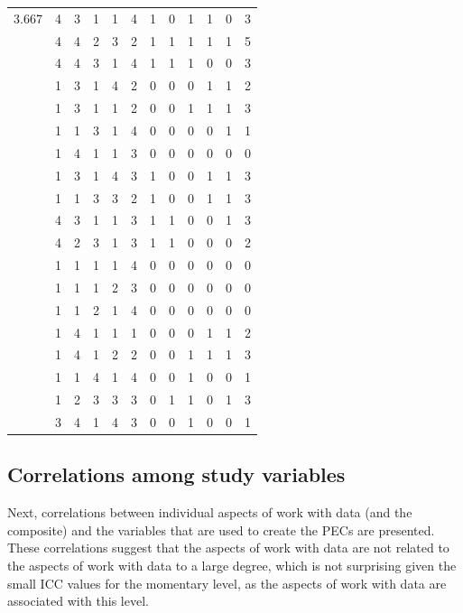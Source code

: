 \documentclass[]{book}
\theoremstyle{definition}
\theoremstyle{definition}
\theoremstyle{definition}
\theoremstyle{remark}
\begin{document}
\begin{table}
{\begin{tabular}[t]{rrrrrrrrrrrr}
3.667 & 4 & 3 & 1 & 1 & 4 & 1 & 0 & 1 & 1 & 0 & 3\\
 & 4 & 4 & 2 & 3 & 2 & 1 & 1 & 1 & 1 & 1 & 5\\
 & 4 & 4 & 3 & 1 & 4 & 1 & 1 & 1 & 0 & 0 & 3\\
 & 1 & 3 & 1 & 4 & 2 & 0 & 0 & 0 & 1 & 1 & 2\\
 & 1 & 3 & 1 & 1 & 2 & 0 & 0 & 1 & 1 & 1 & 3\\
 & 1 & 1 & 3 & 1 & 4 & 0 & 0 & 0 & 0 & 1 & 1\\
 & 1 & 4 & 1 & 1 & 3 & 0 & 0 & 0 & 0 & 0 & 0\\
 & 1 & 3 & 1 & 4 & 3 & 1 & 0 & 0 & 1 & 1 & 3\\
 & 1 & 1 & 3 & 3 & 2 & 1 & 0 & 0 & 1 & 1 & 3\\
 & 4 & 3 & 1 & 1 & 3 & 1 & 1 & 0 & 0 & 1 & 3\\
 & 4 & 2 & 3 & 1 & 3 & 1 & 1 & 0 & 0 & 0 & 2\\
 & 1 & 1 & 1 & 1 & 4 & 0 & 0 & 0 & 0 & 0 & 0\\
 & 1 & 1 & 1 & 2 & 3 & 0 & 0 & 0 & 0 & 0 & 0\\
 & 1 & 1 & 2 & 1 & 4 & 0 & 0 & 0 & 0 & 0 & 0\\
 & 1 & 4 & 1 & 1 & 1 & 0 & 0 & 0 & 1 & 1 & 2\\
 & 1 & 4 & 1 & 2 & 2 & 0 & 0 & 1 & 1 & 1 & 3\\
 & 1 & 1 & 4 & 1 & 4 & 0 & 0 & 1 & 0 & 0 & 1\\
 & 1 & 2 & 3 & 3 & 3 & 0 & 1 & 1 & 0 & 1 & 3\\
 & 3 & 4 & 1 & 4 & 3 & 0 & 0 & 1 & 0 & 0 & 1\\
\bottomrule
\end{tabular}}
\end{table}

\subsection{Correlations among study
variables}\label{correlations-among-study-variables}

Next, correlations between individual aspects of work with data (and the
composite) and the variables that are used to create the PECs are
presented. These correlations suggest that the aspects of work with data
are not related to the aspects of work with data to a large degree,
which is not surprising given the small ICC values for the momentary
level, as the aspects of work with data are associated with this level.
\end{document}

